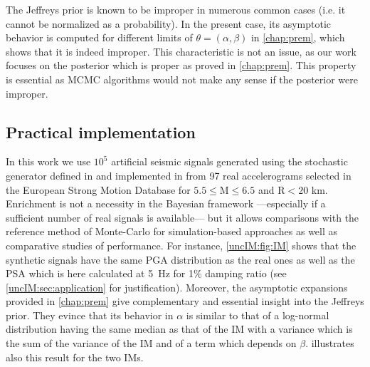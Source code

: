         The Jeffreys prior is known to be improper in numerous common cases (i.e. it cannot be normalized as a probability). In the present case, its asymptotic behavior is computed for different limits of $\theta = (\alpha,\beta)$ in \cref{chap:prem}, which shows that it is indeed improper. This characteristic is not an issue, as our work focuses on the posterior which is proper as proved in \cref{chap:prem}. This property is essential as MCMC algorithms would not make any sense if the posterior were improper.        

        \subsection{Practical implementation} \label{uncIM:sec:practseism}
        
In this work we use $10^5$ artificial seismic signals generated using the stochastic generator defined in \cite{rezaeian_stochastic_2010} and implemented in \cite{sainct_efficient_2020} from 97 real accelerograms selected in the European Strong Motion Database for $5.5 \leq \text{M} \leq 6.5$ and $\text{R} < 20$ km. Enrichment is not a necessity in the Bayesian framework ---especially if a sufficient number of real signals is available--- but it allows comparisons with the reference method of Monte-Carlo for simulation-based approaches as well as comparative studies of performance. For instance, \cref{uncIM:fig:IM} shows that the synthetic signals have the same PGA distribution as the real ones as well as the PSA which is here calculated at 5~Hz for 1\% damping ratio (see \cref{uncIM:sec:application} for justification). Moreover, the asymptotic expansions provided in \cref{chap:prem} give complementary and essential insight into the Jeffreys prior. They evince that its behavior in $\alpha$ is similar to that of a log-normal distribution having the same median as that of the IM with a variance which is the sum of the variance of the IM and of a term which depends on $\beta$.  illustrates also this result for the two IMs.

